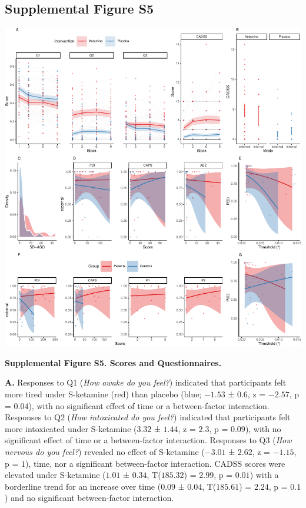 \documentclass[
]{article}
\begin{document}
\hypertarget{supplemental-figure-s5}{%
\subsection{Supplemental Figure S5}\label{supplemental-figure-s5}}

\includegraphics{modes_ketamine_scz_files/figure-latex/Supplemental_Figure_S5-1.pdf}

\textbf{Supplemental Figure S5. Scores and Questionnaires.}

\textbf{A.} Responses to Q1 (\emph{How awake do you feel?}) indicated
that participants felt more tired under S-ketamine (red) than placebo
(blue; \(-1.53\) ± \(0.6\), z = \(-2.57\), p = \(0.04\)), with no
significant effect of time or a between-factor interaction. Responses to
Q2 (\emph{How intoxicated do you feel?}) indicated that participants
felt more intoxicated under S-ketamine (\(3.32\) ± \(1.44\), z =
\(2.3\), p = \(0.09\)), with no significant effect of time or a
between-factor interaction. Responses to Q3 (\emph{How nervous do you
feel?}) revealed no effect of S-ketamine (\(-3.01\) ± \(2.62\), z =
\(-1.15\), p = \(1\)), time, nor a significant between-factor
interaction. CADSS scores were elevated under S-ketamine (\(1.01\) ±
\(0.34\), T(\(185.32\)) = \(2.99\), p = \(0.01\)) with a borderline
trend for an increase over time (\(0.09\) ± \(0.04\), T(\(185.61\)) =
\(2.24\), p = \(0.1\)) and no significant between-factor interaction.
\end{document}
